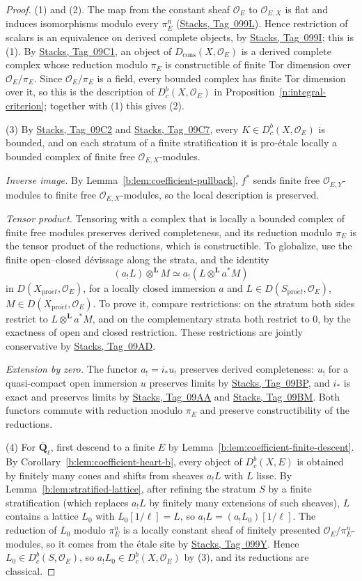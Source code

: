 \documentclass[11pt,a4paper]{article}
\numberwithin{equation}{section}
\theoremstyle{definition}
\theoremstyle{remark}
\newcommand{\D}{D}
\newcommand{\Dbc}{D^b_c}
\newcommand{\Qbar}{\overline{\mathbf Q}_\ell}
\newcommand{\proet}{\mathrm{pro}\acute{e}t}
\newcommand{\stacks}[1]{\href{https://stacks.math.columbia.edu/tag/#1}{\textnormal{Stacks, Tag~#1}}}
\newcommand{\Dc}{D_{\mathrm{cons}}}
\begin{document}
\begin{proof}
(1) and (2). The map from the constant sheaf $\mathcal O_E$ to
$\mathcal O_{E,X}$ is flat and induces isomorphisms modulo every
$\pi_E^n$ (\stacks{099L}). Hence restriction of scalars is an
equivalence on derived complete objects, by \stacks{099I}; this is (1).
By \stacks{09C1}, an object of $\Dc(X,\mathcal O_E)$ is a derived complete
complex whose reduction modulo $\pi_E$ is constructible of finite Tor
dimension over $\mathcal O_E/\pi_E$. Since $\mathcal O_E/\pi_E$ is a field,
every bounded complex has finite Tor dimension over it, so this is the
description of $\Dbc(X,\mathcal O_E)$ in
Proposition~\ref{n:integral-criterion}; together with (1) this gives
(2).

(3) By \stacks{09C2} and \stacks{09C7}, every $K\in\Dbc(X,\mathcal O_E)$ is
bounded, and on each stratum of a finite stratification it is
pro-\'etale locally a bounded complex of finite free
$\mathcal O_{E,X}$-modules.

\emph{Inverse image.} By Lemma~\ref{b:lem:coefficient-pullback}, $f^*$
sends finite free $\mathcal O_{E,Y}$-modules to finite free
$\mathcal O_{E,X}$-modules, so the local description is preserved.

\emph{Tensor product.} Tensoring with a complex that is locally a bounded
complex of finite free modules preserves derived completeness, and its
reduction modulo $\pi_E$ is the tensor product of the reductions, which
is constructible. To globalize, use the finite open--closed
d\'evissage along the strata, and the identity
\[
 (a_!L)\otimes^{\mathbf L}M\simeq a_!(L\otimes^{\mathbf L}a^*M)
\]
in $\D(X_{\proet},\mathcal O_E)$, for a locally closed immersion $a$ and
$L\in\D(S_{\proet},\mathcal O_E)$, $M\in\D(X_{\proet},\mathcal O_E)$. To
prove it, compare restrictions:
on the stratum both sides restrict to $L\otimes^{\mathbf L}a^*M$, and on
the complementary strata both restrict to $0$, by the exactness of
open and closed restriction. These restrictions are jointly conservative
by \stacks{09AD}.

\emph{Extension by zero.} The functor $a_!=i_*u_!$ preserves derived
completeness: $u_!$ for a quasi-compact open immersion $u$ preserves
limits by \stacks{09BP}, and $i_*$ is exact and preserves limits by
\stacks{09AA} and \stacks{09BM}. Both functors commute with reduction
modulo $\pi_E$ and preserve constructibility of the reductions.

(4) For $\Qbar$, first descend to a finite $E$ by
Lemma~\ref{b:lem:coefficient-finite-descent}. By
Corollary~\ref{b:lem:coefficient-heart-b}, every object of $\Dbc(X,E)$ is
obtained by finitely many cones and shifts from sheaves $a_!L$ with $L$
lisse. By Lemma~\ref{b:lem:stratified-lattice}, after refining the
stratum $S$ by a finite stratification (which replaces $a_!L$ by finitely
many extensions of such sheaves), $L$ contains a lattice $L_0$ with
$L_0[1/\ell]=L$, so $a_!L=(a_!L_0)[1/\ell]$. The reduction of $L_0$
modulo $\pi_E^n$ is a locally constant sheaf of finitely presented
$\mathcal O_E/\pi_E^n$-modules, so it comes from the \'etale site by
\stacks{099Y}. Hence $L_0\in\Dbc(S,\mathcal O_E)$, so
$a_!L_0\in\Dbc(X,\mathcal O_E)$ by (3), and its reductions are classical.
\end{proof}
\end{document}
